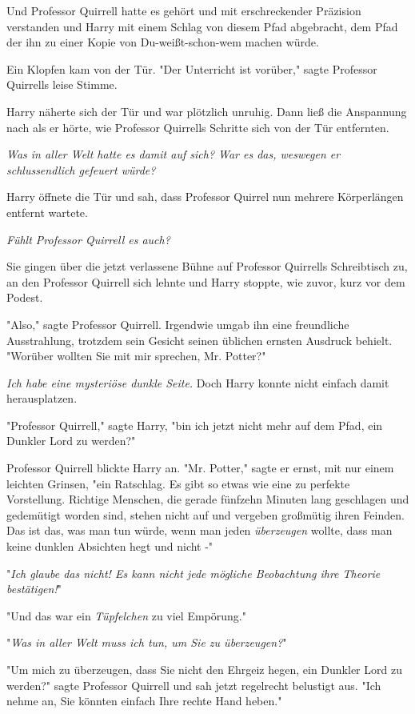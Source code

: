 {Und Professor Quirrell hatte es gehört und mit erschreckender Präzision verstanden und Harry mit einem Schlag von diesem Pfad abgebracht, dem Pfad der ihn zu einer Kopie von Du-weißt-schon-wem machen würde.

Ein Klopfen kam von der Tür. "Der Unterricht ist vorüber," sagte Professor Quirrells leise Stimme.

Harry näherte sich der Tür und war plötzlich unruhig. Dann ließ die Anspannung nach als er hörte, wie Professor Quirrells Schritte sich von der Tür entfernten.

\emph{Was in aller Welt hatte es damit auf sich? War es das, weswegen er schlussendlich gefeuert würde?}

Harry öffnete die Tür und sah, dass Professor Quirrel nun mehrere Körperlängen entfernt wartete.

\emph{Fühlt Professor Quirrell es auch?}

Sie gingen über die jetzt verlassene Bühne auf Professor Quirrells Schreibtisch zu, an den Professor Quirrell sich lehnte und Harry stoppte, wie zuvor, kurz vor dem Podest.

"Also," sagte Professor Quirrell. Irgendwie umgab ihn eine freundliche Ausstrahlung, trotzdem sein Gesicht seinen üblichen ernsten Ausdruck behielt. "Worüber wollten Sie mit mir sprechen, Mr. Potter?"

\emph{Ich habe eine mysteriöse dunkle Seite.} Doch Harry konnte nicht einfach damit herausplatzen.

"Professor Quirrell," sagte Harry, "bin ich jetzt nicht mehr auf dem Pfad, ein Dunkler Lord zu werden?"

Professor Quirrell blickte Harry an. "Mr. Potter," sagte er ernst, mit nur einem leichten Grinsen, "ein Ratschlag. Es gibt so etwas wie eine zu perfekte Vorstellung. Richtige Menschen, die gerade fünfzehn Minuten lang geschlagen und gedemütigt worden sind, stehen nicht auf und vergeben großmütig ihren Feinden. Das ist das, was man tun würde, wenn man jeden \emph{überzeugen} wollte, dass man keine dunklen Absichten hegt und nicht -"

"\emph{Ich glaube das nicht! Es kann nicht jede mögliche Beobachtung ihre Theorie bestätigen!}"

"Und das war ein \emph{Tüpfelchen} zu viel Empörung."

"\emph{Was in aller Welt muss ich tun, um Sie zu überzeugen?}"

"Um mich zu überzeugen, dass Sie nicht den Ehrgeiz hegen, ein Dunkler Lord zu werden?" sagte Professor Quirrell und sah jetzt regelrecht belustigt aus. "Ich nehme an, Sie könnten einfach Ihre rechte Hand heben."

}
